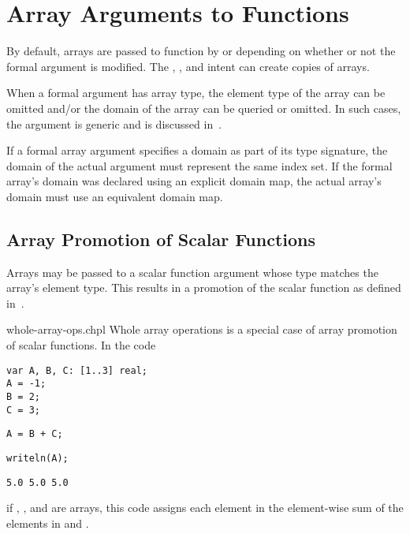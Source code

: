 \section{Array Arguments to Functions}
\label{Array_Arguments_To_Functions}

By default, arrays are passed to function by  or 
depending on whether or not the formal argument is modified. The
, , and  intent can create copies of
arrays.

When a formal argument has array type, the element type of the array
can be omitted and/or the domain of the array can be queried or
omitted.  In such cases, the argument is generic and is discussed
in~.

If a formal array argument specifies a domain as part of its type
signature, the domain of the actual argument must represent the same
index set.  If the formal array's domain was declared using an
explicit domain map, the actual array's domain must use an equivalent
domain map.

\subsection{Array Promotion of Scalar Functions}
\label{Array_Promotion_of_Scalar_Functions}

Arrays may be passed to a scalar function argument whose type
matches the array's element type.  This results in a promotion of the
scalar function as defined in~.

\begin{chapelexample}{whole-array-ops.chpl}
Whole array operations is a special case of array promotion of scalar
functions.  In the code
\begin{chapelpre}
\begin{verbatim}
var A, B, C: [1..3] real;
A = -1;
B = 2;
C = 3;
\end{verbatim}
\end{chapelpre}
\begin{chapel}
\begin{verbatim}
A = B + C;
\end{verbatim}
\end{chapel}
\begin{chapelpost}
\begin{verbatim}
writeln(A);
\end{verbatim}
\end{chapelpost}
\begin{chapeloutput}
\begin{verbatim}
5.0 5.0 5.0
\end{verbatim}
\end{chapeloutput}
if , , and  are arrays, this code assigns each
element in  the element-wise sum of the elements in 
and .
\end{chapelexample}


